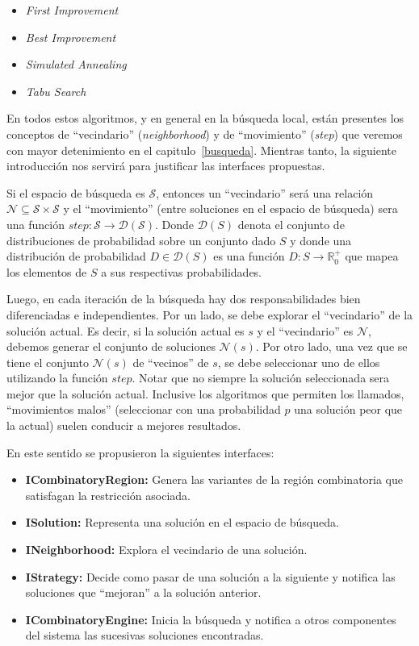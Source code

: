 \begin{itemize}
 \item \textit{First Improvement}
 \item \textit{Best Improvement}
 \item \textit{Simulated Annealing}
 \item \textit{Tabu Search}
\end{itemize}

En todos estos algoritmos, y en general en la b\'usqueda local, est\'an
presentes los conceptos de ``vecindario'' (\textit{neighborhood}) y de
``movimiento'' (\textit{step}) que veremos con mayor detenimiento en el
capitulo~\ref{busqueda}. Mientras tanto, la siguiente introducci\'on nos
servir\'a para justificar las interfaces propuestas.

Si el espacio de b\'usqueda es $\mathcal{S}$, entonces un ``vecindario'' ser\'a
una relaci\'on $\mathcal{N} \subseteq \mathcal{S} \times \mathcal{S}$ y el
``movimiento'' (entre soluciones en el espacio de b\'usqueda) sera una funci\'on
$step: \mathcal{S} \rightarrow \mathcal{D}(\mathcal{S})$. Donde $\mathcal{D}(S)$
denota el conjunto de distribuciones de probabilidad sobre un conjunto dado $S$
y donde una distribuci\'on de probabilidad $D \in \mathcal{D}(S)$ es una
funci\'on $D:S \rightarrow \mathbb{R}^{+}_{0}$ que mapea los elementos de $S$ a
sus respectivas probabilidades.

Luego, en cada iteraci\'on de la b\'usqueda hay dos responsabilidades bien
diferenciadas e independientes. Por un lado, se debe explorar el ``vecindario''
de la soluci\'on actual. Es decir, si la soluci\'on actual es $s$ y el
``vecindario'' es $\mathcal{N}$, debemos generar el conjunto de soluciones
$\mathcal{N}(s)$. Por otro lado, una vez que se tiene el conjunto
$\mathcal{N}(s)$ de ``vecinos'' de $s$, se debe seleccionar uno de ellos
utilizando la funci\'on $step$. Notar que no siempre la soluci\'on seleccionada
sera mejor que la soluci\'on actual. Inclusive los algoritmos que permiten los
llamados, ``movimientos malos'' (seleccionar con una probabilidad $p$ una
soluci\'on peor que la actual) suelen conducir a mejores resultados.

En este sentido se propusieron la siguientes interfaces:

\begin{itemize}
 \item \textbf{ICombinatoryRegion:} Genera las variantes de la regi\'on
combinatoria que satisfagan la restricci\'on asociada.
 \item \textbf{ISolution:} Representa una soluci\'on en el espacio de
b\'usqueda.
 \item \textbf{INeighborhood:} Explora el vecindario de una soluci\'on.
 \item \textbf{IStrategy:} Decide como pasar de una soluci\'on a la siguiente y
notifica las soluciones que ``mejoran'' a la soluci\'on anterior.
 \item \textbf{ICombinatoryEngine:} Inicia la b\'usqueda y notifica a otros
componentes del sistema las sucesivas soluciones encontradas.
\end{itemize}

